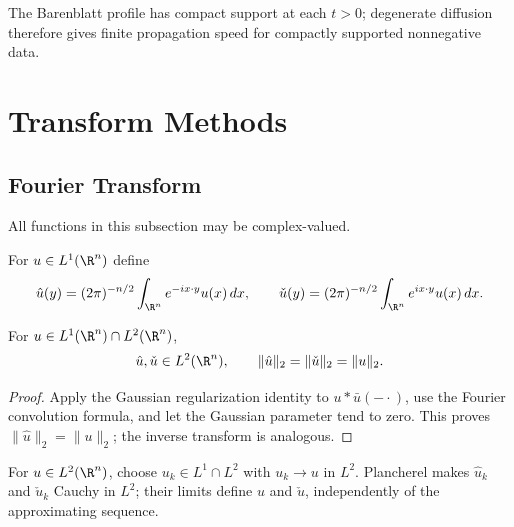 \begin{remark}
\label{rem:porous-medium-finite-propagation-speed}
The Barenblatt profile has compact support at each $t>0$; degenerate diffusion
therefore gives finite propagation speed for compactly supported nonnegative
data.
\end{remark}

\section{Transform Methods}
\label{sec:transform-methods}

\subsection{Fourier Transform}
\label{sec:fourier-transform}

All functions in this subsection may be complex-valued.

\begin{definition}
\label{def:fourier-transform-l1}
For $u\in L^1(\R^n)$ define
\[
\hat u(y)=(2\pi)^{-n/2}\int_{\R^n}e^{-ix\cdot y}u(x)\,dx,
\qquad
\check u(y)=(2\pi)^{-n/2}\int_{\R^n}e^{ix\cdot y}u(x)\,dx.
\]
\end{definition}

\begin{theorem}
\label{thm:plancherel-theorem}
For $u\in L^1(\R^n)\cap L^2(\R^n)$,
\[
\hat u,\check u\in L^2(\R^n),\qquad
\|\hat u\|_2=\|\check u\|_2=\|u\|_2.
\]
\end{theorem}

\begin{proof}
\sketch Apply the Gaussian regularization identity to $u*\bar u(-\cdot)$,
use the Fourier convolution formula, and let the Gaussian parameter tend to
zero. This proves $\|\hat u\|_2=\|u\|_2$; the inverse transform is analogous.
\end{proof}

\begin{definition}
\label{def:fourier-transform-l2}
For $u\in L^2(\R^n)$, choose $u_k\in L^1\cap L^2$ with $u_k\to u$ in $L^2$.
Plancherel makes $\hat u_k$ and $\check u_k$ Cauchy in $L^2$; their limits
define $\hat u$ and $\check u$, independently of the approximating sequence.
\end{definition}

